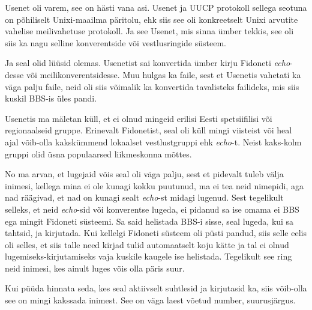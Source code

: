 
Usenet oli varem, see on hästi vana asi. Usenet ja UUCP protokoll sellega 
seotuna on põhiliselt  Unixi-maailma päritolu, ehk siis see oli konkreetselt 
Unixi arvutite vahelise meilivahetuse protokoll. Ja see Usenet, mis  sinna 
ümber tekkis,  see oli siis ka nagu selline konverentside või vestlusringide 
süsteem.


Ja seal olid lüüsid olemas. Usenetist sai konvertida ümber kirju Fidoneti 
\emph{echo}-desse või meilikonverentsidesse. Muu hulgas ka faile, sest et 
Usenetis vahetati ka väga palju faile,  neid oli siis võimalik ka konvertida 
tavalisteks failideks, mis siis kuskil BBS-is üles pandi.


Usenetis ma mäletan küll, et ei olnud mingeid erilisi Eesti spetsiifilisi või 
regionaalseid gruppe. Erinevalt Fidonetist, seal oli küll mingi viisteist või 
heal ajal võib-olla kakskümmend lokaalset  vestlustgruppi ehk \emph{echo}-t. 
Neist kaks-kolm gruppi olid üsna populaarsed liikmeskonna mõttes.


No ma arvan, et lugejaid võis seal oli väga palju, sest et pidevalt tuleb välja 
inimesi, kellega mina ei ole kunagi kokku puutunud, ma ei tea neid nimepidi, 
aga nad räägivad, et nad on kunagi sealt \emph{echo}-st  midagi lugenud. Sest 
tegelikult selleks, et neid \emph{echo}-sid või konverentse lugeda,  ei pidanud 
sa ise omama ei BBS ega mingit Fidoneti süsteemi. Sa said helistada BBS-i 
sisse, seal lugeda, kui sa tahtsid, ja kirjutada. Kui kellelgi Fidoneti süsteem 
oli püsti pandud, siis selle eelis oli selles, et siis talle need kirjad tulid 
automaatselt koju kätte ja tal ei olnud lugemiseks-kirjutamiseks vaja kuskile 
kaugele ise helistada. Tegelikult see ring  neid inimesi, kes  ainult luges 
võis olla päris suur. 

Kui püüda hinnata seda, kes seal aktiivselt suhtlesid ja kirjutasid ka, siis  
võib-olla see on mingi kakssada inimest. See on väga laest võetud number, 
suurusjärgus.


